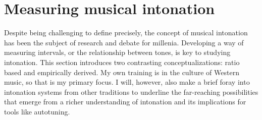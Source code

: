 \section{Measuring musical intonation}
\label{sec:ratio}
Despite being challenging to define precisely, the concept of musical intonation has been the subject of research and debate for millenia. Developing a way of measuring intervals, or the relationship between tones, is key to studying intonation. This section introduces two contrasting conceptualizations: ratio based and empirically derived. My own training is in the culture of Western music, so that is my primary focus. I will, however, also make a brief foray into intonation systems from other traditions to underline the far-reaching possibilities that emerge from a richer understanding of intonation and its implications for tools like autotuning.

